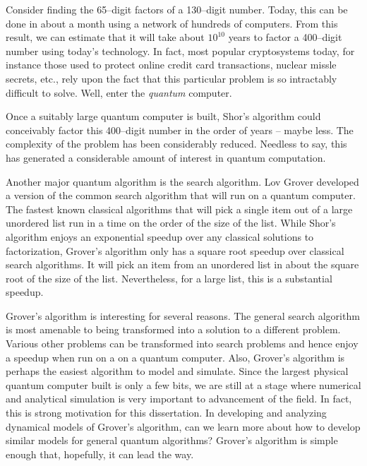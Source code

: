 Consider finding the 65--digit factors of a 130--digit number.
Today, this can be done in about a month using a network of hundreds 
of computers.  From this result, we can estimate that it will take about 
$10^10$ years to factor a 400--digit number using today's technology.
In fact, most popular cryptosystems today, for instance those used to 
protect online credit card transactions, nuclear missle secrets, etc., 
rely upon the fact that this particular problem is so intractably 
difficult to solve.  Well, enter the {\sl quantum} computer.  

Once a suitably large quantum computer is built, Shor's algorithm could 
conceivably factor this 400--digit number in the order of years --
maybe less.  The complexity of the problem has been considerably reduced.
Needless to say, this has generated a considerable amount of interest in 
quantum computation.

Another major quantum algorithm is the search algorithm.  Lov
Grover\cite{Grover:96a} developed a version of the common
search
algorithm that will run on a quantum computer.  
The fastest known classical algorithms that will pick a single item out of
a large unordered list run in a time on the order of the size of the list.
While Shor's algorithm enjoys an exponential speedup over any classical 
solutions to factorization, Grover's algorithm only has a square root speedup
over classical search algorithms.  It will pick an item from an unordered
list in about the square root of the size of the list.  Nevertheless, for
a large list, this is a substantial speedup.

Grover's algorithm is interesting for several reasons.  The general search
algorithm is most amenable to being transformed into a solution to a different
problem.  Various other problems can be transformed into search problems and hence
enjoy a speedup when run on a on a quantum
computer\cite{Durr/Hoyer:96,Grover:96b,Grover:97,Brassard/Hoyer/Tapp:97,
Terhal/Smolin:98,Brassard/Hoyer/Tapp:98,Cerf/Grover/Williams:98,Farhi/Gutmann:98}.
Also, Grover's algorithm is perhaps the easiest algorithm to model and simulate.
Since the largest physical quantum computer built is only a few bits, we
are still at a stage where numerical and analytical simulation is very 
important to advancement of the field.  In fact, this is strong motivation
for this dissertation.  In developing and analyzing dynamical models of 
Grover's algorithm, can we learn more about how to develop similar models 
for general quantum algorithms?  Grover's algorithm is simple enough that,
hopefully, it can lead the way.

